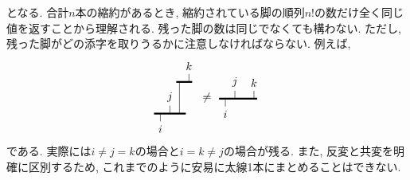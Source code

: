 \documentclass[dvipdfmx]{jsarticle}
\begin{document}
となる.
合計$n$本の縮約があるとき, 縮約されている脚の順列$n!$の数だけ全く同じ値を返すことから理解される.
残った脚の数は同じでなくても構わない.
ただし, 残った脚がどの添字を取りうるかに注意しなければならない.
例えば,
\begin{equation*}
    \vcenter{\hbox{
        \begin{tikzpicture}
            \draw[ultra thick](0,0)--++(1,0);
            \draw[ultra thick](.7,1)--++(.5,0);
            \draw
                (.8,0)--++(0,1)
                (.5,0)--++(0,.25)node[anchor=south]{$j$}
                (.2,0)--++(0,-.25)node[anchor=north]{$i$}
                (1.1,1)--++(0,.25)node[anchor=south]{$k$}
            ;
        \end{tikzpicture}
    }}
    \neq
    \vcenter{\hbox{
        \begin{tikzpicture}
            \draw[ultra thick](0,0)--++(1.2,0);
            \draw
                (.5,0)--++(0,.25)node[anchor=south]{$j$}
                (.2,0)--++(0,-.25)node[anchor=north]{$i$}
                (1.1,0)--++(0,.25)node[anchor=south]{$k$}
            ;
        \end{tikzpicture}
    }}
\end{equation*}
である.
実際には$i\neq j=k$の場合と$i=k\neq j$の場合が残る.
また, 反変と共変を明確に区別するため, これまでのように安易に太線1本にまとめることはできない.
\end{document}
